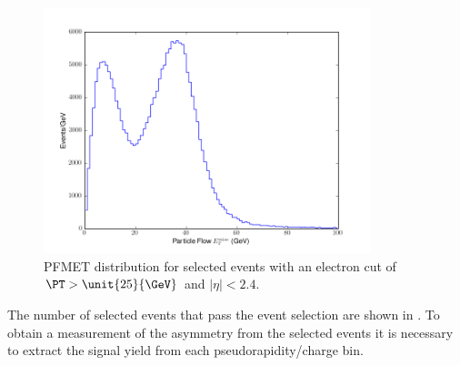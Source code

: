 \begin{figure}[htbp]
  \begin{center}
    \includegraphics*[width=0.85\textwidth]{pfmet_dist}
    \caption{\ac{PFMET} distribution for selected events with an electron cut of
$\PT > \unit{25}{\GeV}$ and $|\eta| < 2.4$.}
  \label{fig:pfmet}
  \end{center}
\end{figure}

The number of selected events that pass the
event selection are shown in . To obtain a
measurement of the asymmetry from the selected events it is necessary to extract
the signal yield from each pseudorapidity/charge bin.

